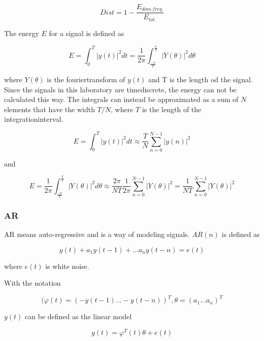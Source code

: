 \documentclass[12pt]{article}
\begin{document}
 \begin{equation}Dist = 1-\frac{E_{dom. freq.}}{E_{tot.}}\end{equation}

The energy $E$ for a signal is defined as

\begin{equation}E=\int_{0}^T \vert y(t)\vert ^2 dt=\frac{1}{2\pi}\int_{\frac{-\pi}{T}}^{\frac{\pi}{T}}\vert Y(\theta)\vert ^2d\theta \end{equation}

where $Y(\theta)$ is the fouriertransform of $y(t)$ and T is the length od the signal. Since the signals in this laboratory are timediscrete, the energy can not be calculated this way. The integrals can instead be approximated as a sum of $N$ elements that have the width $T/N$, where $T$ is the length of the integrationinterval.

\begin{equation}
E=\int_{0}^T \vert y(t)\vert^2 dt\approx \frac{T}{N}\sum_{n=0}^{N-1}\vert y(n) \vert^2 
\label{A} 
\end{equation}

and

\begin{equation}
E=\frac{1}{2\pi}\int_{\frac{-\pi}{T}}^{\frac{\pi}{T}}\vert Y(\theta)\vert ^2d\theta \approx \frac{2\pi}{NT}\frac{1}{2\pi}\sum_{n=0}^{N-1}\vert Y(\theta) \vert^2=\frac{1}{NT}\sum_{n=0}^{N-1}\vert Y(\theta) \vert^2 
\end{equation}

\subsubsection{AR}
AR means auto-regressive and is a way of modeling signals. $AR(n)$ is defined as

\begin{equation} y(t)+a_1y(t-1)+...a_ny(t-n)=e(t) \end{equation}

where $e(t)$ is white noise.

With the notation

\begin{equation}
(\varphi(t) =(-y(t-1) ... -y(t-n))^T,\theta = (a_1 ... a_n)^T 
\end{equation}

$y(t)$ can be defined as the linear model

\begin{equation}
y(t)=\varphi^T(t)\theta+ e(t)
\end{equation}
\end{document}
